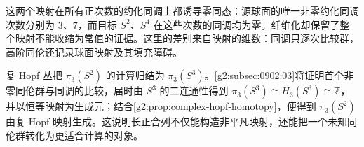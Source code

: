 这两个映射在所有正次数的约化同调上都诱导零同态：源球面的唯一非零约化同调次数分别为 \(3\)、\(7\)，而目标 \(S^2\)、\(S^4\) 在这些次数的同调均为零。纤维化却保留了整个映射不能收缩为常值的证据。这里的差别来自映射的维数：同调只逐次比较群，高阶同伦还记录球面映射及其填充障碍。

\ProseParagraphBreak

复 Hopf 丛把 \(\pi_3(S^2)\) 的计算归结为 \(\pi_3(S^3)\)。\cref{g2:subsec:0902:03}将证明首个非零同伦群与同调的比较，届时由 \(S^3\) 的二连通性得到 \(\pi_3(S^3)\cong H_3(S^3)\cong\mathbb Z\)，并以恒等映射为生成元；结合\cref{g2:prop:complex-hopf-homotopy}，便得到 \(\pi_3(S^2)\) 由复 Hopf 映射生成。这说明长正合列不仅能构造非平凡映射，还能把一个未知同伦群转化为更适合计算的对象。

